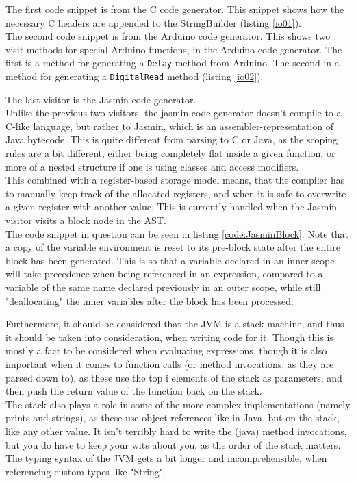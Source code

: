 The first code snippet is from the C code generator. This snippet shows how the necessary C headers are appended to the StringBuilder (listing \ref{io01}).\\

\noindent\newline
The second code snippet is from the Arduino code generator. This shows two visit methods for special Arduino functions, in the Arduino code generator. The first is a method for generating a \texttt{Delay} method from Arduino. The second in a method for generating a \texttt{DigitalRead} method (listing \ref{io02}).

\noindent\newline
The last visitor is the Jasmin code generator.\\
Unlike the previous two visitors, the jasmin code generator doesn't compile to a C-like language, but rather to Jasmin, which is an assembler-representation of Java bytecode. This is quite different from parsing to C or Java, as the scoping rules are a bit different, either being completely flat inside a given function, or more of a nested structure if one is using classes and access modifiers.\\
This combined with a register-based storage model means, that the compiler has to manually keep track of the allocated registers, and when it is safe to overwrite a given register with another value. This is currently handled when the Jasmin visitor visits a block node in the AST.\\
The code snippet in question can be seen in listing \ref{code:JasminBlock}. Note that a copy of the variable environment is reset to its pre-block state after the entire block has been generated. This is so that a variable declared in an inner scope will take precedence when being referenced in an expression, compared to a variable of the same name declared previously in an outer scope, while still "deallocating" the inner variables after the block has been processed.

\noindent\newline
Furthermore, it should be considered that the JVM is a stack machine, and thus it should be taken into consideration, when writing code for it. Though this is mostly a fact to be considered when evaluating expressions, though it is also important when it comes to function calls (or method invocations, as they are parsed down to), as these use the top i elements of the stack as parameters, and then push the return value of the function back on the stack.\\
The stack also plays a role in some of the more complex implementations (namely prints and strings), as these use object references like in Java, but on the stack, like any other value. It isn't terribly hard to write the (java) method invocations, but you do have to keep your wits about you, as the order of the stack matters. The typing syntax of the JVM gets a bit longer and incomprehensible, when referencing custom types like "String".